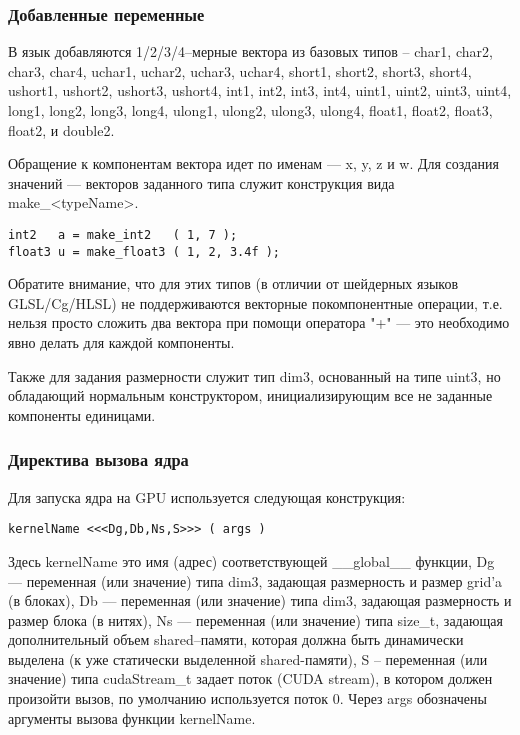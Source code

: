 \subsubsection{Добавленные переменные}

В язык добавляются 1/2/3/4--мерные вектора из базовых типов -- char1, char2, char3, char4, uchar1, uchar2, uchar3, uchar4, short1, short2, short3, short4, ushort1, ushort2, ushort3, ushort4, int1, int2, int3, int4, uint1, uint2, uint3, uint4, long1, long2, long3, long4, ulong1, ulong2, ulong3, ulong4, float1, float2, float3, float2, и double2.

Обращение к компонентам вектора идет по именам --- x, y, z и w. Для создания значений --- векторов заданного типа служит конструкция вида make\_<typeName>.

\begin{verbatim}
int2   a = make_int2   ( 1, 7 );
float3 u = make_float3 ( 1, 2, 3.4f );
\end{verbatim}

Обратите внимание, что для этих типов (в отличии от шейдерных языков GLSL/Cg/HLSL) не поддерживаются векторные покомпонентные операции, т.е. нельзя просто сложить два вектора при помощи оператора "+" --- это необходимо явно делать для каждой компоненты.

Также для задания размерности служит тип dim3, основанный на типе uint3, но обладающий нормальным конструктором, инициализирующим все не заданные компоненты единицами.

\subsubsection{Директива вызова ядра}

Для запуска ядра на GPU используется следующая конструкция:
\begin{verbatim}
kernelName <<<Dg,Db,Ns,S>>> ( args )
\end{verbatim}
Здесь kernelName это имя (адрес) соответствующей \_\_global\_\_ функции, Dg --- переменная (или значение) типа dim3, задающая размерность и размер grid'a (в блоках), Db --- переменная (или значение) типа dim3, задающая размерность и размер блока (в нитях), Ns --- переменная (или значение) типа size\_t, задающая дополнительный объем shared--памяти, которая должна быть динамически выделена (к уже статически выделенной shared-памяти), S -- переменная (или значение) типа cudaStream\_t задает поток (CUDA stream), в котором должен произойти вызов, по умолчанию используется поток 0. Через args обозначены аргументы вызова функции kernelName.


